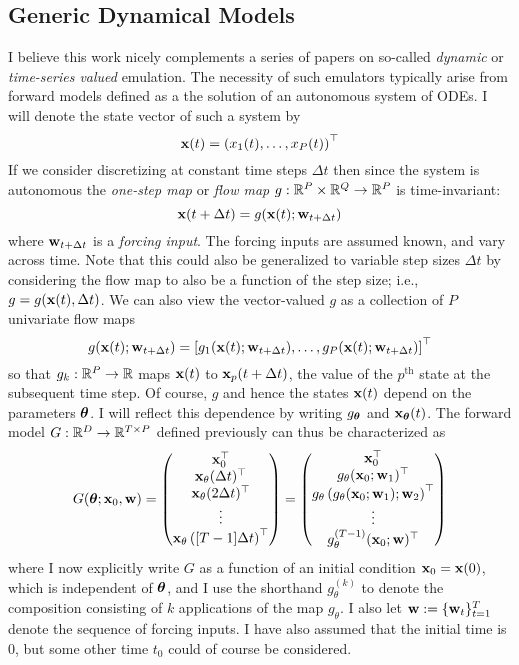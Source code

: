 \documentclass[12pt]{article}
\begin{document}
\subsection{Generic Dynamical Models}
I believe this work nicely complements a series of papers on so-called \textit{dynamic} or \textit{time-series valued} emulation. The necessity of such emulators typically arise from forward models 
defined as a the solution of an autonomous system of ODEs. I will denote the state vector of such a system by 
\[\mathbf{x}(t) = \left(x_1(t), \dots, x_P(t) \right)^{\top} \]
If we consider discretizing at constant time steps $\Delta t$ then since the system is autonomous the \textit{one-step map} or \textit{flow map} $g: \mathbb{R}^P \times \mathbb{R}^Q \to \mathbb{R}^P$ is time-invariant: 
 \[\mathbf{x}(t + \Delta t) = g(\mathbf{x}(t); \mathbf{w}_{t + \Delta t})\]
 where $\mathbf{w}_{t + \Delta t}$ is a \textit{forcing input}. The forcing inputs are assumed known, and vary across time. 
 Note that this could also be generalized to variable step sizes $\Delta t$ by considering the flow map to also be a function of the step size; i.e., $g = g(\mathbf{x}(t), \Delta t)$. We can also view the 
 vector-valued $g$ as a collection of $P$ univariate flow maps
 \[g(\mathbf{x}(t); \mathbf{w}_{t + \Delta t}) = \left[g_1(\mathbf{x}(t); \mathbf{w}_{t + \Delta t}), \dots, g_P(\mathbf{x}(t); \mathbf{w}_{t + \Delta t}) \right]^{\top}\]
 so that $g_k: \mathbb{R}^P \to \mathbb{R}$ maps $\mathbf{x}(t)$ to $\mathbf{x}_p(t + \Delta t)$, the value of the $p^{\text{th}}$ state at the subsequent time step. Of course, $g$ and hence the states $\mathbf{x}(t)$ depend on 
 the parameters $\boldsymbol{\theta}$. I will reflect this dependence by writing $g_{\boldsymbol{\theta}}$ and $\mathbf{x}_{\boldsymbol{\theta}}(t)$. The forward model $G: \mathbb{R}^{D} \to \mathbb{R}^{T \times P}$ defined previously can thus be characterized 
 as 
 \[
 G(\boldsymbol{\theta}; \mathbf{x}_0, \mathbf{w}) = \begin{pmatrix} \mathbf{x}_0^{\top} \\ \mathbf{x}_\theta(\Delta t)^{\top} \\  \mathbf{x}_\theta(2\Delta t)^{\top} \\ \vdots \\ \mathbf{x}_\theta\left([T-1]\Delta t\right)^{\top} \end{pmatrix} = 
 \begin{pmatrix} \mathbf{x}_0^{\top} \\ g_\theta(\mathbf{x}_0; \mathbf{w}_1)^{\top} \\  g_\theta\left(g_\theta(\mathbf{x}_0; \mathbf{w}_1); \mathbf{w}_2 \right)^{\top} \\ \vdots \\ g_\theta^{(T-1)}(\mathbf{x}_0; \mathbf{w})^{\top} \end{pmatrix}
 \]
 where I now explicitly write $G$ as a function of an initial condition $\mathbf{x}_0 = \mathbf{x}(0)$, which is independent of $\boldsymbol{\theta}$, and I use the shorthand $g_\theta^{(k)}$ to denote 
 the composition consisting of $k$ applications of the map $g_\theta$. I also let $\mathbf{w} := \{\mathbf{w}_t\}_{t = 1}^{T}$ denote the sequence of forcing inputs. 
 I have also assumed that the initial time is $0$, but some other time $t_0$ could of course be considered. 
\end{document}
